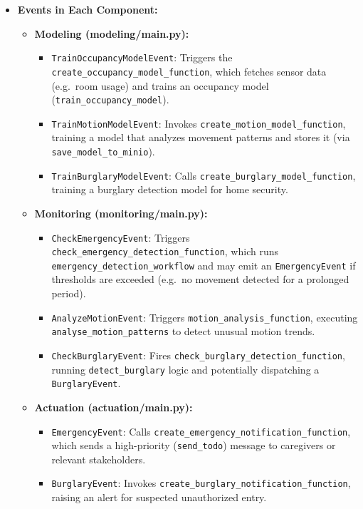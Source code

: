 \documentclass[A4,10pt]{article}
\begin{document}
\begin{itemize}
    \item \textbf{Events in Each Component:}
    \begin{itemize}
        \item \textbf{Modeling (modeling/main.py):}
        \begin{itemize}
            \item \texttt{TrainOccupancyModelEvent}: Triggers the \texttt{create\_occupancy\_model\_function}, which fetches sensor data (e.g.\ room usage) and trains an occupancy model (\texttt{train\_occupancy\_model}).  
            \item \texttt{TrainMotionModelEvent}: Invokes \texttt{create\_motion\_model\_function}, training a model that analyzes movement patterns and stores it (via \texttt{save\_model\_to\_minio}).  
            \item \texttt{TrainBurglaryModelEvent}: Calls \texttt{create\_burglary\_model\_function}, training a burglary detection model for home security.
        \end{itemize}

        \item \textbf{Monitoring (monitoring/main.py):}
        \begin{itemize}
            \item \texttt{CheckEmergencyEvent}: Triggers \texttt{check\_emergency\_detection\_function}, which runs \texttt{emergency\_detection\_workflow} and may emit an \texttt{EmergencyEvent} if thresholds are exceeded (e.g.\ no movement detected for a prolonged period).
            \item \texttt{AnalyzeMotionEvent}: Triggers \texttt{motion\_analysis\_function}, executing \texttt{analyse\_motion\_patterns} to detect unusual motion trends.
            \item \texttt{CheckBurglaryEvent}: Fires \texttt{check\_burglary\_detection\_function}, running \texttt{detect\_burglary} logic and potentially dispatching a \texttt{BurglaryEvent}.
        \end{itemize}

        \item \textbf{Actuation (actuation/main.py):}
        \begin{itemize}
            \item \texttt{EmergencyEvent}: Calls \texttt{create\_emergency\_notification\_function}, which sends a high-priority (\texttt{send\_todo}) message to caregivers or relevant stakeholders.
            \item \texttt{BurglaryEvent}: Invokes \texttt{create\_burglary\_notification\_function}, raising an alert for suspected unauthorized entry.
        \end{itemize}
    \end{itemize}


\end{itemize}
\end{document}
